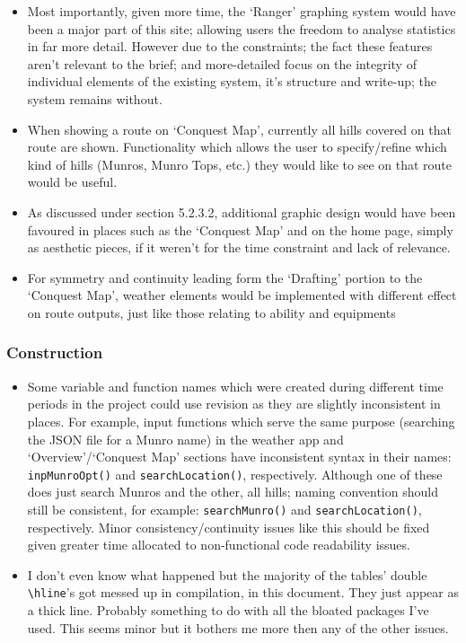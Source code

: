 \documentclass[11pt, english]{article}
\begin{document}
	\begin{itemize}
	\setlength\itemsep{0cm}
		\item Most importantly, given more time, the `Ranger' graphing system would have been a major part of this site; allowing users the freedom to analyse statistics in far more detail. However due to the constraints; the fact these features aren't relevant to the brief; and more-detailed focus on the integrity of individual elements of the existing system, it's structure and write-up; the system remains without.\\
		\item When showing a route on `Conquest Map', currently all hills covered on that route are shown. Functionality which allows the user to specify/refine which kind of hills (Munros, Munro Tops, etc.) they would like to see on that route would be useful.
		\item As discussed under section 5.2.3.2, additional graphic design would have been favoured in places such as the `Conquest Map' and on the home page, simply as aesthetic pieces, if it weren't for the time constraint and lack of relevance.
		\item For symmetry and continuity leading form the `Drafting' portion to the `Conquest Map', weather elements would be implemented with different effect on route outputs, just like those relating to ability and equipments
	\end{itemize}
	
		\subsubsection{Construction}

	\begin{itemize}
	\setlength\itemsep{0cm}
		\item Some variable and function names which were created during different time periods in the project could use revision as they are slightly inconsistent in places. For example, input functions which serve the same purpose (searching the JSON file for a Munro name) in the weather app and `Overview'/`Conquest Map' sections have inconsistent syntax in their names: \texttt{inpMunroOpt()} and \texttt{searchLocation()}, respectively. Although one of these does just search Munros and the other, all hills; naming convention should still be consistent, for example: \texttt{searchMunro()} and \texttt{searchLocation()}, respectively. Minor consistency/continuity issues like this should be fixed given greater time allocated to non-functional code readability issues.\\
		\item I don't even know what happened but the majority of the tables' double \verb|\hline|'s got messed up in compilation, in this document. They just appear as a thick line. Probably something to do with all the bloated packages I've used. This seems minor but it bothers me more then any of the other issues.
	\end{itemize}
\end{document}
